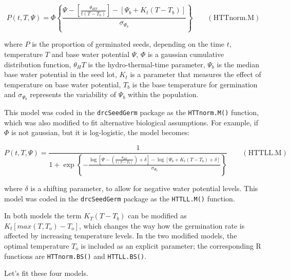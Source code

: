 \documentclass[
]{book}
\begin{document}
\[ P(t, T, \Psi) = \Phi \left\{ \frac{\Psi - \left[ \frac{\theta_{HT}}{t (T - T_b)} \right] - \left[\Psi_b + K_t (T - T_b) \right] }{\sigma_{\Psi_b}} \right\}   \quad \quad (\textrm{HTTnorm.M})\]

where \(P\) is the proportion of germinated seeds, depending on the time \(t\), temperature \(T\) and base water potential \(\Psi\), \(\Phi\) is a gaussian cumulative distribution function, \(\theta_HT\) is the hydro-thermal-time parameter, \(\Psi_{b}\) is the median base water potential in the seed lot, \(K_t\) is a parameter that measures the effect of temperature on base water potential, \(T_{b}\) is the base temperature for germination and \(\sigma_{\Psi_b}\) represents the variability of \(\Psi_b\) within the population.

This model was coded in the \texttt{drcSeedGerm} package as the \texttt{HTTnorm.M()} function, which was also modified to fit alternative biological assumptions. For example, if \(\Phi\) is not gaussian, but it is log-logistic, the model becomes:

\[ P(t, T, \Psi) = \frac{1}{1 + \exp \left\{ -  \frac{ \log \left[ \Psi - \left( \frac{\theta_{HT}}{t ( T - T_b )} \right) + \delta \right] - \log \left[ \Psi_b + K_t (T - T_b) + \delta \right] }{\sigma_{\Psi_b}} \right\} } \quad \quad (\textrm{HTTLL.M})\]

where \(\delta\) is a shifting parameter, to allow for negative water potential levels. This model was coded in the \texttt{drcSeedGerm} package as the \texttt{HTTLL.M()} function.

In both models the term \(K_T(T - T_b)\) can be modified as \(K_t[max(T,T_o) - T_o]\), which changes the way how the germination rate is affected by increasing temperature levels. In the two modified models, the optimal temperature \(T_o\) is included as an explicit parameter; the corresponding R functions are \texttt{HTTnorm.BS()} and \texttt{HTTLL.BS()}.

Let's fit these four models.
\end{document}
